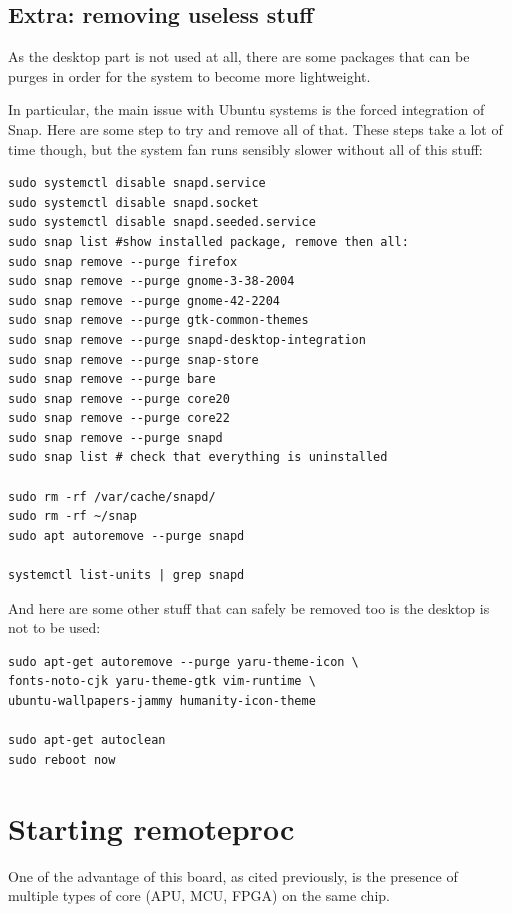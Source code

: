 \documentclass[10pt]{article}
\begin{document}
\subsection{Extra: removing useless stuff}
As the desktop part is not used at all, there are some packages
that can be purges in order for the system to become more lightweight.

In particular, the main issue with Ubuntu systems is the forced integration of
Snap. Here are some step to try and remove all of that. These steps
take a lot of time though, but the system fan runs sensibly slower
without all of this stuff:
\begin{tcolorbox}
\begin{verbatim}
sudo systemctl disable snapd.service
sudo systemctl disable snapd.socket
sudo systemctl disable snapd.seeded.service
sudo snap list #show installed package, remove then all:
sudo snap remove --purge firefox
sudo snap remove --purge gnome-3-38-2004
sudo snap remove --purge gnome-42-2204
sudo snap remove --purge gtk-common-themes
sudo snap remove --purge snapd-desktop-integration
sudo snap remove --purge snap-store
sudo snap remove --purge bare
sudo snap remove --purge core20
sudo snap remove --purge core22
sudo snap remove --purge snapd
sudo snap list # check that everything is uninstalled

sudo rm -rf /var/cache/snapd/
sudo rm -rf ~/snap
sudo apt autoremove --purge snapd

systemctl list-units | grep snapd
\end{verbatim}
\end{tcolorbox}

And here are some other stuff that can safely be removed too is the desktop is
not to be used:
\begin{tcolorbox}
\begin{verbatim}
sudo apt-get autoremove --purge yaru-theme-icon \
fonts-noto-cjk yaru-theme-gtk vim-runtime \
ubuntu-wallpapers-jammy humanity-icon-theme

sudo apt-get autoclean
sudo reboot now
\end{verbatim}
\end{tcolorbox}

\pagebreak
\section{Starting remoteproc}
One of the advantage of this board, as cited previously, is the presence of
multiple types of core (APU, MCU, FPGA) on the same chip.
\end{document}
